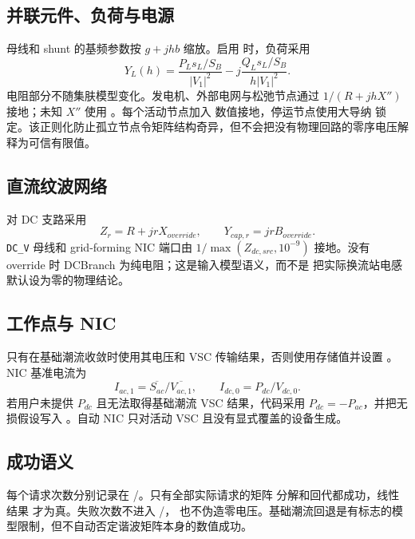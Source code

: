 \subsection{并联元件、负荷与电源}
母线和 shunt 的基频参数按 $g+jhb$ 缩放。启用  时，负荷采用
\begin{equation}
Y_L(h)=\frac{P_Ls_L/S_B}{|V_1|^2}-j\frac{Q_Ls_L/S_B}{h|V_1|^2}.
\end{equation}
电阻部分不随集肤模型变化。发电机、外部电网与松弛节点通过 $1/(R+jhX'')$ 接地；未知 $X''$ 使用
。每个活动节点加入  数值接地，停运节点使用大导纳
锁定。该正则化防止孤立节点令矩阵结构奇异，但不会把没有物理回路的零序电压解释为可信有限值。

\subsection{直流纹波网络}
 对 DC 支路采用
\begin{equation}
Z_r=R+jrX_{override},\qquad Y_{cap,r}=jrB_{override}.
\end{equation}
\texttt{DC\_V} 母线和 grid-forming NIC 端口由
$1/\max(Z_{dc,src},10^{-9})$ 接地。没有 override 时 DCBranch 为纯电阻；这是输入模型语义，而不是
把实际换流站电感默认设为零的物理结论。

\subsection{工作点与 NIC}
 只有在基础潮流收敛时使用其电压和 VSC
传输结果，否则使用存储值并设置 。NIC 基准电流为
\begin{equation}
I_{ac,1}=\overline{S_{ac}}/\overline{V_{ac,1}},\qquad I_{dc,0}=P_{dc}/V_{dc,0}.
\end{equation}
若用户未提供 $P_{dc}$ 且无法取得基础潮流 VSC 结果，代码采用 $P_{dc}=-P_{ac}$，并把无损假设写入
。自动 NIC 只对活动 VSC 且没有显式覆盖的设备生成。

\subsection{成功语义}
每个请求次数分别记录在 /。只有全部实际请求的矩阵
分解和回代都成功，线性结果  才为真。失败次数不进入 /，
也不伪造零电压。基础潮流回退是有标志的模型限制，但不自动否定谐波矩阵本身的数值成功。
